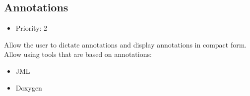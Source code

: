 \subsection{Annotations}
\begin{itemize}
	\item Priority: 2
\end{itemize}
Allow the user to dictate annotations and display annotations in compact form.
Allow using tools that are based on annotations:
\begin{itemize}
	\item JML
	\item Doxygen
\end{itemize}
